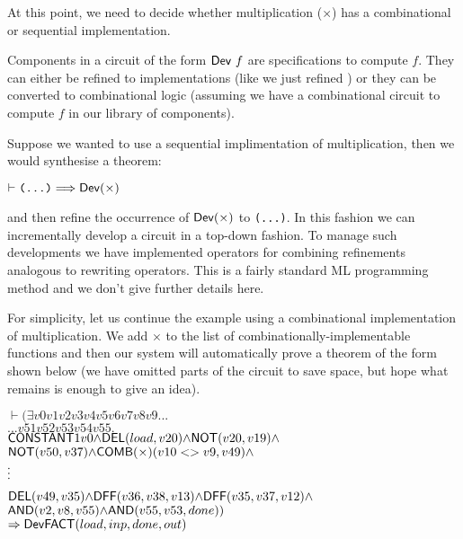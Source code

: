 \vspace*{-2mm}

At this point, we need to decide whether multiplication ($\times$)
has a combinational or sequential implementation.

Components in a
circuit of the form $\mathsf{Dev}~f$ are specifications to compute
$f$. They can either be refined to implementations (like we just
refined ) or they can be converted to
combinational logic (assuming we have a combinational circuit to
compute $f$ in our library of components).

Suppose we wanted to use a sequential implimentation of multiplication,
then we would synthesise a theorem:

\vspace*{-2mm}

{\baselineskip10pt\begin{alltt}
\( \vdash \texttt{(...)} \Longrightarrow \DEF{Dev}({\times}) \)
\end{alltt}}

\vspace*{-2mm}

\noindent and then refine the occurrence of $\mathsf{Dev}(\times)$
to \texttt{(...)}.  In this fashion we can incrementally develop a
circuit in a top-down fashion. To manage such developments we have
implemented operators for combining refinements analogous to rewriting
operators. This is a fairly standard ML programming
method and we don't give further details here.

For simplicity, let us continue the example using a combinational
implementation of multiplication. We add ${\times}$ to the list of
combinationally-implementable functions and then our system will
automatically prove a theorem of the form shown below (we have omitted
parts of the circuit to save space, but hope what remains is enough to
give an idea).

\vspace*{-2mm}

{\baselineskip10pt\begin{alltt}
\( \vdash ({\exists}v0 v1 v2 v3 v4 v5 v6 v7 v8 v9 ...                                             \)
\(      ... v51 v52 v53 v54 v55.                                                                       \)
\(     \DEF{CONSTANT} 1 v0 {\wedge} \DEF{DEL}(load,v20) {\wedge} \DEF{NOT}(v20,v19) {\wedge}       \)
\(     \DEF{NOT}(v50,v37) {\wedge} \DEF{COMB}({\times}) (v10<>v9,v49) {\wedge}                     \)
      \(\raisebox{3mm}{\vdots}\)
\(     \DEF{DEL}(v49,v35) {\wedge} \DEF{DFF}(v36,v38,v13) {\wedge} \DEF{DFF}(v35,v37,v12) {\wedge} \)
\(     \DEF{AND}(v2,v8,v55) {\wedge} \DEF{AND}(v55,v53,done))                                     \)
\(    \Rightarrow \DEF{Dev} \DEF{FACT} (load,inp,done,out)                                         \)
\end{alltt}}


